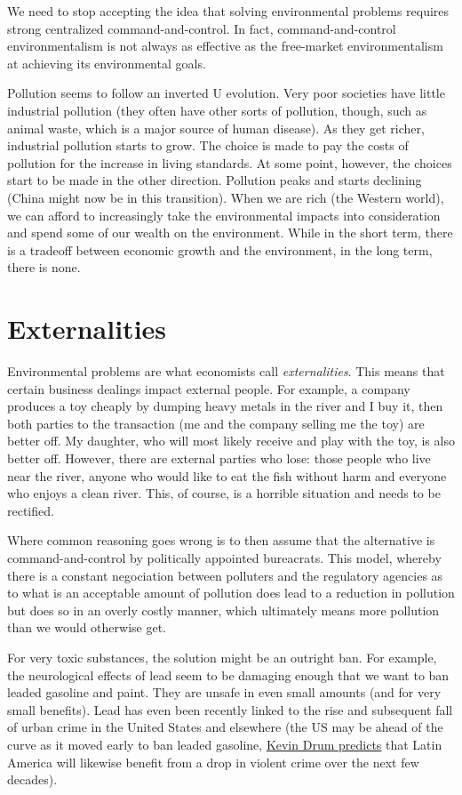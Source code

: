 We need to stop accepting the idea that solving environmental problems requires
strong centralized command-and-control. In fact, command-and-control
environmentalism is not always as effective as the free-market environmentalism
at achieving its environmental goals.

Pollution seems to follow an inverted U evolution. Very poor societies have
little industrial pollution (they often have other sorts of pollution, though,
such as animal waste, which is a major source of human disease). As they get
richer, industrial pollution starts to grow. The choice is made to pay the
costs of pollution for the increase in living standards. At some point,
however, the choices start to be made in the other direction. Pollution peaks
and starts declining (China might now be in this transition). When we are rich
(the Western world), we can afford to increasingly take the environmental
impacts into consideration and spend some of our wealth on the environment.
While in the short term, there is a tradeoff between economic growth and the
environment, in the long term, there is none.

\section{Externalities}

Environmental problems are what economists call \emph{externalities}. This
means that certain business dealings impact external people. For example, a
company produces a toy cheaply by dumping heavy metals in the river and I buy
it, then both parties to the transaction (me and the company selling me the
toy) are better off. My daughter, who will most likely receive and play with
the toy, is also better off. However, there are external parties who lose:
those people who live near the river, anyone who would like to eat the fish
without harm and everyone who enjoys a clean river. This, of course, is a
horrible situation and needs to be rectified.

Where common reasoning goes wrong is to then assume that the alternative is
command-and-control by politically appointed bureacrats. This model, whereby
there is a constant negociation between polluters and the regulatory agencies
as to what is an acceptable amount of pollution does lead to a reduction in
pollution but does so in an overly costly manner, which ultimately means more
pollution than we would otherwise get.

For very toxic substances, the solution might be an outright ban. For example,
the neurological effects of lead seem to be damaging enough that we want to ban
leaded gasoline and paint. They are unsafe in even small amounts (and for very
small benefits). Lead has even been recently linked to the rise and subsequent
fall of urban crime in the United States and elsewhere (the US may be ahead of
the curve as it moved early to ban leaded gasoline,
\href{http://www.motherjones.com/kevin-drum/2013/01/lead-and-crime-ill-be-melissa-harris-perry-show-sunday-10-am}{Kevin
Drum predicts} that Latin America will likewise benefit from a drop in violent
crime over the next few decades).

